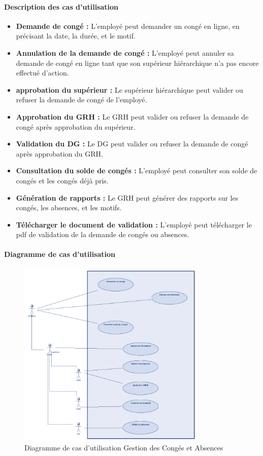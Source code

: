 \paragraph{Description des cas d'utilisation}
\begin{itemize}
    \item \textbf{Demande de congé :} L'employé peut demander un congé en ligne, en précisant la date, la durée, et le motif.
    \item \textbf{Annulation de la demande de congé :} L'employé peut annuler sa demande de congé en ligne tant que son supérieur hiérarchique n'a pas encore effectué d'action.
    \item \textbf{approbation du supérieur :} Le supérieur hiérarchique peut valider ou refuser la demande de congé de l'employé.
    \item \textbf{Approbation du GRH :} Le GRH peut valider ou refuser la demande de congé après approbation du supérieur.
    \item \textbf{Validation du DG :} Le DG peut valider ou refuser la demande de congé après approbation du GRH.
    \item \textbf{Consultation du solde de congés :} L'employé peut consulter son solde de congés et les congés déjà pris.
    \item \textbf{Génération de rapports :} Le GRH peut générer des rapports sur les congés, les absences, et les motifs.
    \item \textbf{Télécharger le document de validation :} L'employé peut télécharger le pdf de validation de la demande de congés ou absences.
\end{itemize}
\paragraph{Diagramme de cas d'utilisation}
\begin{figure}[H]
    \centering
    \includegraphics[width=0.8\textwidth]{images/diagrammes/use-cases/conges.png}
    \caption{Diagramme de cas d'utilisation Gestion des Congés et Absences}
    \label{fig:use_case_gestion_conges}

\end{figure}
